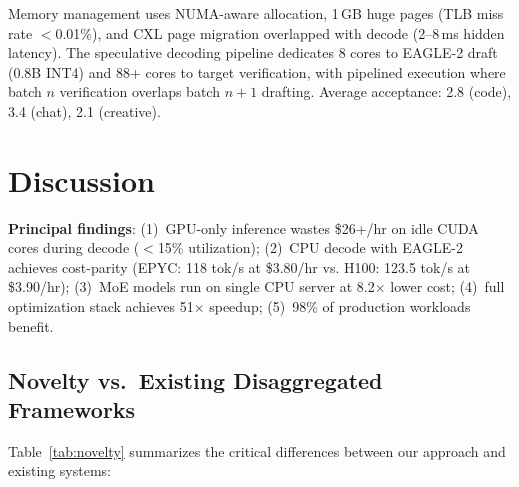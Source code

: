 \documentclass[conference,10pt]{IEEEtran}
\begin{document}
Memory management uses NUMA-aware allocation, 1\,GB huge pages (TLB miss rate $<$0.01\%), and CXL page migration overlapped with decode (2--8\,ms hidden latency). The speculative decoding pipeline dedicates 8 cores to EAGLE-2 draft (0.8B INT4) and 88+ cores to target verification, with pipelined execution where batch $n$ verification overlaps batch $n+1$ drafting. Average acceptance: 2.8 (code), 3.4 (chat), 2.1 (creative).


\section{Discussion}
\label{sec:disc}

\textbf{Principal findings}: (1)~GPU-only inference wastes \$26+/hr on idle CUDA cores during decode ($<$15\% utilization); (2)~CPU decode with EAGLE-2 achieves cost-parity (EPYC: 118 tok/s at \$3.80/hr vs. H100: 123.5 tok/s at \$3.90/hr); (3)~MoE models run on single CPU server at 8.2$\times$ lower cost; (4)~full optimization stack achieves 51$\times$ speedup; (5)~98\% of production workloads benefit.

\subsection{Novelty vs.\ Existing Disaggregated Frameworks}

Table~\ref{tab:novelty} summarizes the critical differences between our approach and existing systems:

\begin{table}[!htbp]
\caption{Differentiation from Existing Disaggregated Serving}
\label{tab:novelty}
\centering\scriptsize
{}
\end{table}
\end{document}
